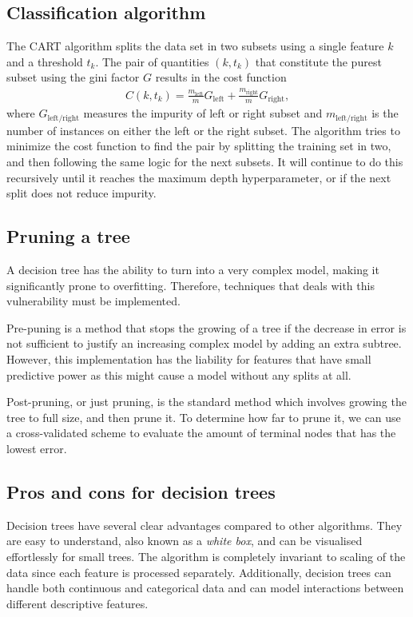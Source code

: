 \subsection{Classification algorithm}
The CART algorithm splits the data set in two subsets using a single feature $k$ and a threshold $t_k$. The pair of quantities $(k,t_k)$ that constitute the purest subset using the gini factor $G$ results in the cost function
\begin{align}
  C(k, t_k) = \frac{m_{\text{left}}}{m}G_{\text{left}} + \frac{m_{\text{right}}}{m}G_{\text{right}},
\end{align}
where $G_{\text{left} / \text{right}}$ measures the impurity of left or right subset and $m_{\text{left} / \text{right}}$ is the number of instances on either the left or the right subset. The algorithm tries to minimize the cost function to find the pair by splitting the training set in two, and then following the same logic for the next subsets. It will continue to do this recursively until it reaches the maximum depth hyperparameter, or if the next split does not reduce impurity.

\subsection{Pruning a tree}

A decision tree has the ability to turn into a very complex model, making it significantly prone to overfitting. Therefore, techniques that deals with this vulnerability must be implemented.

Pre-puning is a method that stops the growing of a tree if the decrease in error is not sufficient to justify an increasing complex model by adding an extra subtree. However, this implementation has the liability for features that have small predictive power as this might cause a model without any splits at all.

Post-pruning, or just pruning, is the standard method which involves growing the tree to full size, and then prune it. To determine how far to prune it, we can use a cross-validated scheme to evaluate the amount of terminal nodes that has the lowest error.

\subsection{Pros and cons for decision trees}

Decision trees have several clear advantages compared to other algorithms. They are easy to understand, also known as a \textit{white box}, and can be visualised effortlessly for small trees. The algorithm is completely invariant to scaling of the data since each feature is processed separately. Additionally, decision trees can handle both continuous and categorical data and can model interactions between different descriptive features.


